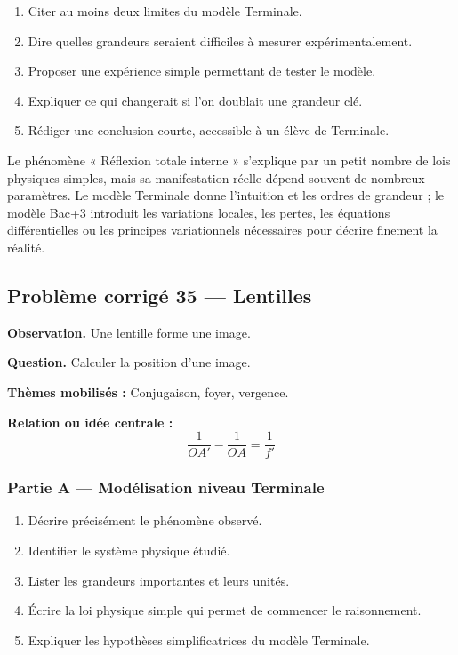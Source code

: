 \documentclass[11pt,a4paper]{article}
\begin{document}
\begin{enumerate}
  \item Citer au moins deux limites du modèle Terminale.
  \item Dire quelles grandeurs seraient difficiles à mesurer expérimentalement.
  \item Proposer une expérience simple permettant de tester le modèle.
  \item Expliquer ce qui changerait si l'on doublait une grandeur clé.
  \item Rédiger une conclusion courte, accessible à un élève de Terminale.
\end{enumerate}

\begin{corrigebox}
Le phénomène « Réflexion totale interne » s'explique par un petit nombre de lois physiques simples, mais sa manifestation réelle dépend souvent de nombreux paramètres. Le modèle Terminale donne l'intuition et les ordres de grandeur ; le modèle Bac+3 introduit les variations locales, les pertes, les équations différentielles ou les principes variationnels nécessaires pour décrire finement la réalité.
\end{corrigebox}

\subsection{Problème corrigé 35 — Lentilles}

\begin{exercicebox}
\textbf{Observation.} Une lentille forme une image.

\medskip
\textbf{Question.} Calculer la position d'une image.

\medskip
\textbf{Thèmes mobilisés :} Conjugaison, foyer, vergence.

\medskip
\textbf{Relation ou idée centrale :}
\[
\frac1{OA'}-\frac1{OA}=\frac1{f'}
\]
\end{exercicebox}

\subsubsection*{Partie A — Modélisation niveau Terminale}

\begin{enumerate}
  \item Décrire précisément le phénomène observé.
  \item Identifier le système physique étudié.
  \item Lister les grandeurs importantes et leurs unités.
  \item Écrire la loi physique simple qui permet de commencer le raisonnement.
  \item Expliquer les hypothèses simplificatrices du modèle Terminale.
\end{enumerate}
\end{document}
